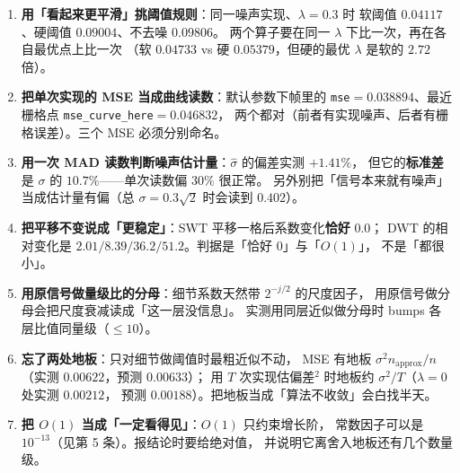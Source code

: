 \begin{enumerate}
        通用阈值 $0.999$ 是它的 $3.56$ 倍，该处 MSE $0.12994$ 比完全不去噪
        （$0.08963$）还差 $45\%$。
  \item \textbf{用「看起来更平滑」挑阈值规则}：同一噪声实现、$\lambda=0.3$ 时
        软阈值 $0.04117$、硬阈值 $0.09004$、不去噪 $0.09806$。
        两个算子要在同一 $\lambda$ 下比一次，再在各自最优点上比一次
        （软 $0.04733$ vs 硬 $0.05379$，但硬的最优 $\lambda$ 是软的 $2.72$ 倍）。
  \item \textbf{把单次实现的 MSE 当成曲线读数}：默认参数下帧里的
        \texttt{mse}$=0.038894$、最近栅格点 \texttt{mse\_curve\_here}$=0.046832$，
        两个都对（前者有实现噪声、后者有栅格误差）。三个 MSE 必须分别命名。
  \item \textbf{用一次 MAD 读数判断噪声估计量}：$\hat\sigma$ 的偏差实测 $+1.41\%$，
        但它的\textbf{标准差}是 $\sigma$ 的 $10.7\%$——单次读数偏 $30\%$ 很正常。
        另外别把「信号本来就有噪声」当成估计量有偏（总 $\sigma=0.3\sqrt2$ 时会读到 $0.402$）。
  \item \textbf{把平移不变说成「更稳定」}：SWT 平移一格后系数变化\textbf{恰好} $0.0$；
        DWT 的相对变化是 $2.01/8.39/36.2/51.2$。判据是「恰好 0」与「$O(1)$」，
        不是「都很小」。
  \item \textbf{用原信号做量级比的分母}：细节系数天然带 $2^{-j/2}$ 的尺度因子，
        用原信号做分母会把尺度衰减读成「这一层没信息」。
        实测用同层近似做分母时 bumps 各层比值同量级（$\le10$）。
  \item \textbf{忘了两处地板}：只对细节做阈值时最粗近似不动，
        MSE 有地板 $\sigma^2n_{\text{approx}}/n$（实测 $0.00622$，预测 $0.00633$）；
        用 $T$ 次实现估偏差$^2$ 时地板约 $\sigma^2/T$（$\lambda=0$ 处实测 $0.00212$，
        预测 $0.00188$）。把地板当成「算法不收敛」会白找半天。
  \item \textbf{把 $O(1)$ 当成「一定看得见」}：$O(1)$ 只约束增长阶，
        常数因子可以是 $10^{-13}$（见第 5 条）。报结论时要给绝对值，
        并说明它离舍入地板还有几个数量级。
\end{enumerate}
